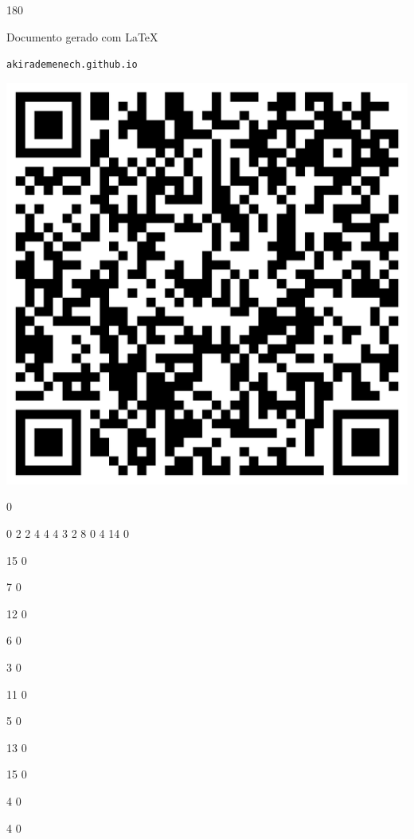 \documentclass[12pt]{article}
\begin{document}
	\begin{turn}{180}	
		\begin{minipage}{\textwidth}		  
		  Documento gerado com \LaTeX			
		  
		  \texttt{akirademenech.github.io}

		  \includegraphics[height=0.3\textheight]{2e-2.pdf}

		\end{minipage}	
	\end{turn}  
		  
		\vfill  
		  
{
	0	%

	0	%
	2	%
	2	%
	4	%
	4	%
	4	%
	3	%
	2	%
	8	%
	0	%
	4	%
	14	%
	0	%

	15	%
	0	%

	7	%
	0	%

	12	%
	0	%

	6	%
	0	%

	3	%
	0	%

	11	%
	0	%

	5	%
	0	%

	13	%
	0	%

	15	%
	0	%

	4	%
	0	%

	4	%
	0	%

}	  
		    	
\end{document}
